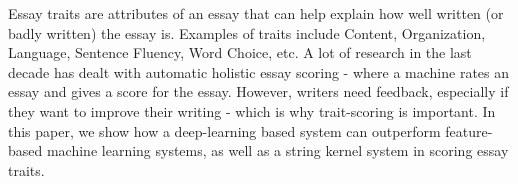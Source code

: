 Essay traits are attributes of an essay that can help explain how well written (or badly written) the essay is. Examples of traits include Content, Organization, Language, Sentence Fluency, Word Choice, etc. A lot of research in the last decade has dealt with automatic holistic essay scoring - where a machine rates an essay and gives a score for the essay. However, writers need feedback, especially if they want to improve their writing - which is why trait-scoring is important. In this paper, we show how a deep-learning based system can outperform feature-based machine learning systems, as well as a string kernel system in scoring essay traits.
